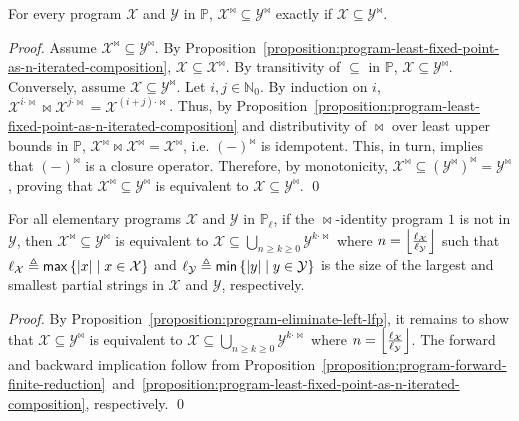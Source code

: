 \documentclass{llncs}
\newcommand{\alt}{\mathrel{|}}
\newcommand{\deq}{\triangleq}
\newcommand{\nats}{\mathbb{N}}
\newcommand{\cX}{\mathcal{X}}
\newcommand{\cY}{\mathcal{Y}}
\newcommand{\bbP}{\mathbb{P}}
\DeclarePairedDelimiter\abs{\lvert}{\rvert}
\DeclarePairedDelimiter{\floor}{\lfloor}{\rfloor}
\begin{document}
\begin{proposition}
\label{proposition:program-eliminate-left-lfp}
For every program $\cX$ and  $\cY$ in $\bbP$, $\cX^{\Join} \subseteq \cY^{\Join}$ exactly if $\cX \subseteq \cY^{\Join}$.
\end{proposition}
\begin{proof}
Assume $\cX^{\Join} \subseteq \cY^{\Join}$. By Proposition~\ref{proposition:program-least-fixed-point-as-n-iterated-composition}, $\cX \subseteq \cX^{\Join}$. By transitivity of $\subseteq$ in $\bbP$, $\cX \subseteq \cY^{\Join}$. Conversely, assume $\cX \subseteq \cY^{\Join}$. Let $i, j \in \nats_0$. By induction on $i$, $\cX^{i \cdot \Join} \Join \cX^{j \cdot \Join} = \cX^{(i+j) \cdot \Join}$. Thus, by Proposition~\ref{proposition:program-least-fixed-point-as-n-iterated-composition} and distributivity of $\Join$ over least upper bounds in $\bbP$, $\cX^{\Join} \Join \cX^{\Join} = \cX^{\Join}$, i.e. $(-)^{\Join}$ is idempotent. This, in turn, implies that $(-)^{\Join}$ is a closure operator. Therefore, by monotonicity, $\cX^{\Join} \subseteq \left(\cY^{\Join}\right)^{\Join} = \cY^{\Join}$, proving that $\cX^{\Join} \subseteq \cY^{\Join}$ is equivalent to $\cX \subseteq \cY^{\Join}$. \qed
\end{proof}

\begin{theorem}
\label{theorem:program-reduction}
For all elementary programs $\cX$ and $\cY$ in $\bbP_\ell$, if the $\Join$-identity program $1$ is not in $\cY$, then $\cX^{\Join} \subseteq \cY^{\Join}$ is equivalent to $\cX \subseteq \bigcup_{n \ge k \ge 0} \cY^{k \cdot \Join}$ where $n = \floor[\Big]{\frac{\ell_\cX}{\ell_\cY}}$ such that $\ell_\cX \deq \mathsf{max}\left\{\abs{x} \alt x \in \cX\right\}$ and $\ell_\cY \deq \mathsf{min}\left\{\abs{y} \alt y \in \cY\right\}$ is the size of the largest and smallest partial strings in $\cX$ and $\cY$, respectively.
\end{theorem}
\begin{proof}
By Proposition~\ref{proposition:program-eliminate-left-lfp}, it remains to show that $\cX \subseteq \cY^{\Join}$ is equivalent to $\cX \subseteq \bigcup_{n \ge k \ge 0} \cY^{k \cdot \Join}$ where $n = \floor[\Big]{\frac{\ell_\cX}{\ell_\cY}}$. The forward and backward implication follow from Proposition~\ref{proposition:program-forward-finite-reduction}~and~\ref{proposition:program-least-fixed-point-as-n-iterated-composition}, respectively. \qed
\end{proof}
\end{document}
